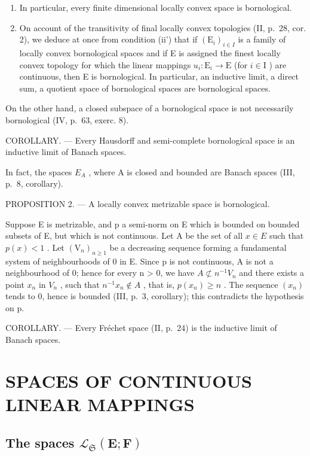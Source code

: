 \begin{enumerate}
\def\labelenumi{\arabic{enumi})}
\setcounter{enumi}{1}
\item
  In particular, every finite dimensional locally convex space is bornological.
\item
  On account of the transitivity of final locally convex topologies (II, p.~28, cor. 2), we deduce at once from condition (ii') that if \((\mathrm{E}_i)_{i\in I}\) is a family of locally convex bornological spaces and if E is assigned the finest locally convex topology for which the linear mappings \(u_{i}:\mathrm{E}_{i}\to \mathrm{E}\) (for \(i\in \mathrm{I}\) ) are continuous, then E is bornological. In particular, an inductive limit, a direct sum, a quotient space of bornological spaces are bornological spaces.
\end{enumerate}

On the other hand, a closed subspace of a bornological space is not necessarily bornological (IV, p.~63, exerc. 8).

COROLLARY. --- Every Hausdorff and semi-complete bornological space is an inductive limit of Banach spaces.

In fact, the spaces \(E_{A}\) , where A is closed and bounded are Banach spaces (III, p.~8, corollary).

PROPOSITION 2. --- A locally convex metrizable space is bornological.

Suppose E is metrizable, and p a semi-norm on E which is bounded on bounded subsets of E, but which is not continuous. Let A be the set of all \(x \in E\) such that \(p(x) < 1\) . Let \((\mathrm{V}_{n})_{n \geqslant 1}\) be a decreasing sequence forming a fundamental system of neighbourhoods of 0 in E. Since p is not continuous, A is not a neighbourhood of 0; hence for every n \textgreater{} 0, we have \(A \not\subset n^{-1}V_{n}\) and there exists a point \(x_{n}\) in \(V_{n}\) , such that \(n^{-1}x_{n} \notin A\) , that is, \(p(x_{n}) \geqslant n\) . The sequence \((x_{n})\) tends to 0, hence is bounded (III, p.~3, corollary); this contradicts the hypothesis on p.

COROLLARY. --- Every Fréchet space (II, p.~24) is the inductive limit of Banach spaces.

\section{SPACES OF CONTINUOUS LINEAR MAPPINGS}

\subsection{\texorpdfstring{The spaces \(\mathcal{L}_{\mathfrak{S}}(\mathbf{E};\mathbf{F})\)}{The spaces \textbackslash mathcal\{L\}\_\{\textbackslash mathfrak\{S\}\}(\textbackslash mathbf\{E\};\textbackslash mathbf\{F\})}}

